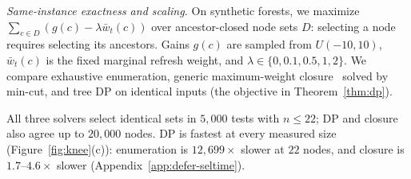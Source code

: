 \label{sec:exp:selector}
\emph{Same-instance exactness and scaling.}
On synthetic forests, we maximize $\sum_{c\in D}(g(c)-\lambda\bar w_t(c))$
over ancestor-closed node sets $D$: selecting a node requires selecting its
ancestors. Gains $g(c)$ are sampled from $U(-10,10)$, $\bar w_t(c)$ is the
fixed marginal refresh weight, and $\lambda\in\{0,0.1,0.5,1,2\}$.
We compare exhaustive enumeration, generic maximum-weight
closure~\cite{picard1976maximal} solved by min-cut, and tree DP on identical
inputs (the objective in Theorem~\ref{thm:dp}).

All three solvers select identical sets in $5{,}000$ tests with $n\le22$;
DP and closure also agree up to $20{,}000$ nodes. DP is fastest at every
measured size (Figure~\ref{fig:knee}(c)): enumeration is $12{,}699\times$
slower at $22$ nodes, and closure is $1.7$--$4.6\times$ slower
(Appendix~\ref{app:defer-seltime}).
